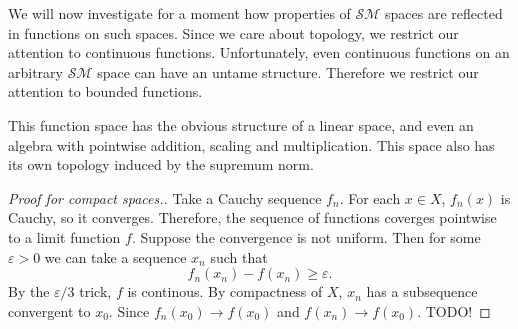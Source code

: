 
We will now investigate for a moment how properties of \( \mathcal{SM} \) spaces are reflected in functions on such spaces. Since we care about topology, we restrict our attention to continuous functions. Unfortunately, even continuous functions on an arbitrary \( \mathcal{SM} \) space can have an untame structure. Therefore we restrict our attention to bounded functions. 


This function space has the obvious structure of a linear space, and even an algebra with pointwise addition, scaling and multiplication. This space also has its own topology induced by the supremum norm.


\begin{proof}[Proof for compact spaces.]
Take a Cauchy sequence \( f_n \). For each \( x \in X \), \( f_n(x) \) is Cauchy, so it converges. Therefore, the sequence of functions coverges pointwise to a limit function \( f \). Suppose the convergence is not uniform. Then for some \(\varepsilon > 0 \) we can take a sequence \( x_n \) such that
\[ 
    f_n(x_n) - f(x_n) \geqslant \varepsilon. 
\]
By the \(\varepsilon/3 \) trick, \( f \) is continous. By compactness of \( X \), \( x_n \) has a subsequence convergent to \( x_0 \). Since \( f_n(x_0) \to f(x_0) \) and \( f(x_n) \to f(x_0) \). TODO!
\end{proof}

